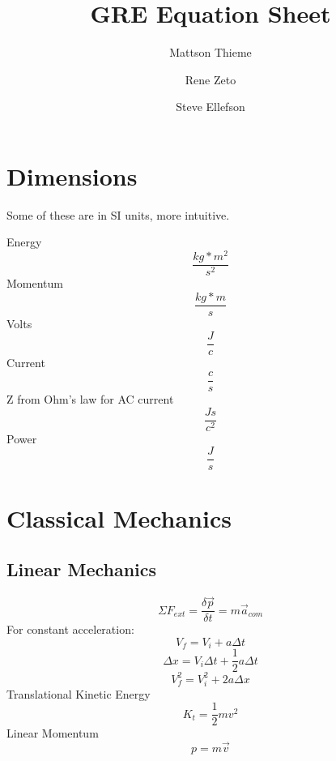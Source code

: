 \documentclass{article}
\begin{document}
\title{GRE Equation Sheet}
\author{Mattson Thieme \and Rene Zeto \and Steve Ellefson}
\maketitle


\section{Dimensions} Some of these are in SI units, more intuitive.

Energy\begin{equation}\frac{kg*m^2}{s^2}
\end{equation} 
Momentum\begin{equation}\frac{kg*m}{s}\end{equation}
Volts\begin{equation}\frac{J}{c}\end{equation}
Current\begin{equation}\frac{c}{s}\end{equation}
Z from Ohm's law for AC current\begin{equation}\frac{Js}{c^2}\end{equation}
Power\begin{equation}\frac{J}{s}\end{equation}






\section{Classical Mechanics}
\subsection{Linear Mechanics}
\begin{equation}\Sigma F_{ext} = \frac{\delta \vec{p}}{\delta t} = m\vec{a}_{com}\end{equation}
For constant acceleration:
\begin{equation}V_{f} = V_{i} + a\Delta t\end{equation}
\begin{equation}\Delta x = V_{i} \Delta t + \frac{1}{2}a\Delta t\end{equation}
\begin{equation}V_{f}^2 = V_{i}^2 + 2a\Delta x\end{equation}
Translational Kinetic Energy
\begin{equation}K_{t} = \frac{1}{2}mv^2\end{equation}
Linear Momentum
\begin{equation}p = m\vec{v}\end{equation}
\end{document}

